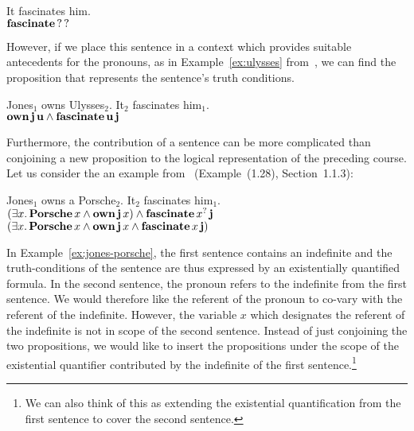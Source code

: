 \begin{exe}
  \ex It fascinates him. \label{ex:no-antecedent} \\
  $\textbf{fascinate}\,?\,?$
\end{exe}

However, if we place this sentence in a context which provides suitable
antecedents for the pronouns, as in Example~\ref{ex:ulysses}
from~\cite{kamp1993discourse}, we can find the proposition that represents
the sentence's truth conditions.

\begin{exe}
  \ex Jones$_1$ owns Ulysses$_2$. It$_2$ fascinates him$_1$. \label{ex:ulysses} \\
  $\textbf{own}\,\textbf{j}\,\textbf{u} \land \textbf{fascinate}\,\textbf{u}\,\textbf{j}$
\end{exe}

Furthermore, the contribution of a sentence can be more complicated than
conjoining a new proposition to the logical representation of the preceding
course. Let us consider the an example from~\cite{kamp1993discourse}
(Example~(1.28), Section~1.1.3):

\begin{exe}
  \ex Jones$_1$ owns a Porsche$_2$. It$_2$ fascinates him$_1$. \label{ex:jones-porsche} \\
  $(\exists x.\, \textbf{Porsche}\,x \land \textbf{own}\,\textbf{j}\,x)
  \land \textbf{fascinate}\,x^?\,\textbf{j}$ \\
  $(\exists x.\, \textbf{Porsche}\,x \land \textbf{own}\,\textbf{j}\,x
  \land \textbf{fascinate}\,x\,\textbf{j})$ \\
\end{exe}

In Example~\ref{ex:jones-porsche}, the first sentence contains an
indefinite and the truth-conditions of the sentence are thus expressed by
an existentially quantified formula. In the second sentence, the pronoun
refers to the indefinite from the first sentence. We would therefore like
the referent of the pronoun to co-vary with the referent of the
indefinite. However, the variable $x$ which designates the referent of the
indefinite is not in scope of the second sentence. Instead of just
conjoining the two propositions, we would like to insert the propositions
under the scope of the existential quantifier contributed by the indefinite
of the first sentence.\footnote{We can also think of this as extending the
  existential quantification from the first sentence to cover the second
  sentence.}

